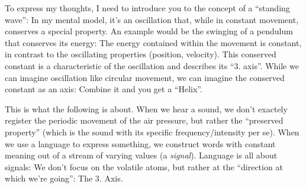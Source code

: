 To express my thoughts,
I need to introduce you to the concept of a ``standing wave'':
In my mental model, it's an oscillation that, while in constant movement,
conserves a special property.
An example would be the swinging of a pendulum that conserves its energy:
The energy contained within the movement is constant, in contrast to the oscillating properties (position, velocity).
This conserved constant is a characteristic of the oscillation and describes its ``3. axis''.
While we can imagine oscillation like circular movement, we can imagine the conserved constant as an axis:
Combine it and you get a ``Helix''.

This is what the following is about.
When we hear a sound, we don't exactely register the periodic movement of the air pressure,
but rather the ``preserved property'' (which is the sound with its specific frequency/intensity per se).
When we use a language to express something, we construct words with constant meaning out of a stream of varying values (a \textit{signal}).
Language is all about signals: We don't focus on the volatile atoms, but rather at the ``direction at which we're going'': The 3. Axis.

